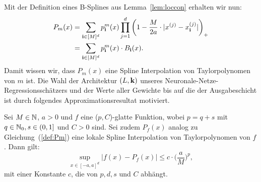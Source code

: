 Mit der Definition eines B-Splines aus Lemma~\ref{lem:loccon} erhalten wir nun:
\begin{equation}
\label{def:Pm}
\begin{split}
P_m(x) &= \sum_{\mathbf{i} \in [M]^d} p_{\mathbf{i}}^m(x) \prod_{j = 1}^{d} \bigg(1 - \frac{M}{2a} \cdot |x^{(j)} - x_{\mathbf{i}}^{(j)}|\bigg)_+ \\
& = \sum_{\mathbf{i} \in [M]^d} p_{\mathbf{i}}^m(x) \cdot B_{\mathbf{i}}(x).
\end{split}
\end{equation}
Damit wissen wir, dass $P_m(x)$ eine Spline Interpolation von Taylorpolynomen von $m$ ist.
Die Wahl der Architektur $(L,\mathbf{k})$ unseres Neuronale-Netze-Regressionsschätzers und der Werte aller Gewichte bis auf die der Ausgabeschicht ist durch folgendes Approximationsresultat motiviert.
\begin{lem}
\label{lem:pcsmooth}
Sei $M \in \mathbb{N}$, $a > 0$ und $f$ eine ($p, C$)-glatte Funktion, wobei $p = q + s$ mit $q \in \mathbb{N}_0, s \in (0,1]$ und $C > 0$ sind. Sei zudem $P_f(x)$ analog zu Gleichung~(\ref{def:Pm}) eine lokale Spline Interpolation von Taylorpolynomen von $f$. Dann gilt:
$$\sup_{x \in [-a, a]^d} |f(x) - P_f(x)|  \leq c \cdot \bigg(\frac{a}{M}\bigg)^p,$$
mit einer Konstante $c$, die von $p, d, s$ und $C$ abhängt.
\end{lem}
